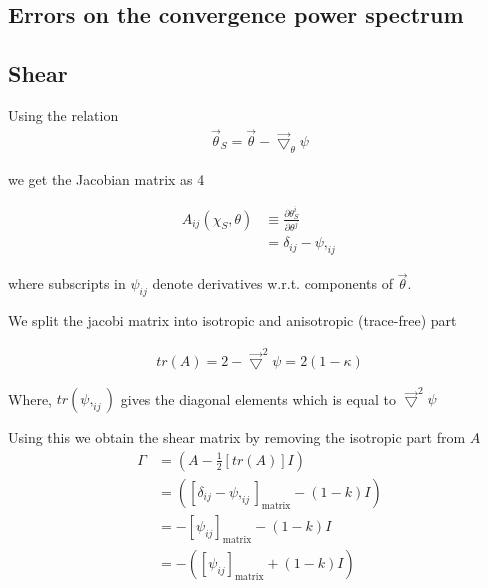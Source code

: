 \documentclass[12pt]{article}
\newcommand{\beq}{\begin{equation}}
\newcommand{\eeq}{\end{equation}}
\newcommand{\beqa}{\begin{eqnarray}}
\newcommand{\eeqa}{\end{eqnarray}}
\newcommand{\beqal}{\begin{aligned}}
\newcommand{\eeqal}{\end{aligned}}
\numberwithin{equation}{section}
\begin{document}
\subsection{Errors on the convergence power spectrum}

\subsection{Shear}
Using the relation
\beqa
\vec{\theta}_S = \vec{\theta} - \vec{\bigtriangledown}_\theta\psi 
\eeqa

we get the Jacobian matrix as 
4%
%

\beq
\beqal
A_{ij}(\chi_S, \theta) &\equiv \frac{\partial\theta_S^i}{\partial\theta^j} 
\\
&= \delta_{ij} - \psi,_{ij}
\eeqal
\eeq

where subscripts in $\psi_{ij}$ denote derivatives w.r.t. components of $\vec{\theta}$.

We split the jacobi matrix into isotropic and anisotropic (trace-free) part

\beq
\beqal
tr(A) = 2 - \vec{\bigtriangledown}^2 \psi = 2(1-\kappa)
\eeqal
\eeq

Where, $tr(\psi,_{ij})$ gives the diagonal elements which is equal to $\vec{\bigtriangledown}^2 \psi$

Using this we obtain the shear matrix by removing the isotropic part from $A$
\beq
\beqal
\Gamma &=  \left( A - \frac{1}{2} [tr (A)] I \right)
\\
&= \left( [\delta_{ij} - \psi,_{ij}]_\textrm{matrix} - (1-k)I \right)
\\
&= -[\psi_{ij}]_\textrm{matrix} - (1-k)I
\\
&= -\left([\psi_{ij}]_\textrm{matrix} + (1-k)I \right)
\eeqal
\eeq
\end{document}
